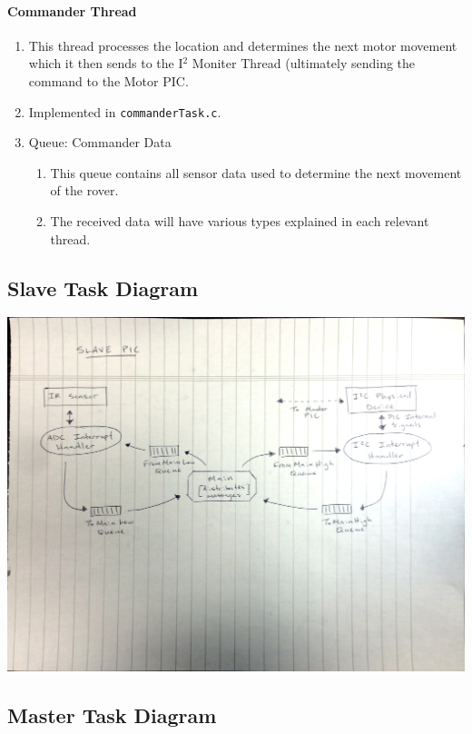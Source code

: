 \paragraph*{Commander Thread}
\begin{enumerate}
	\item This thread processes the location and determines the next motor movement which it then sends to the I$^2$ Moniter Thread (ultimately sending the command to the Motor PIC.
	\item Implemented in \texttt{commanderTask.c}.
	\item Queue: Commander Data
	\begin{enumerate}
		\item This queue contains all sensor data used to determine the next movement of the rover.
		\item The received data will have various types explained in each relevant thread.
	\end{enumerate}
\end{enumerate}

\subsection*{Slave Task Diagram}

\begin{center}
	\includegraphics[scale=0.6]{Images/SlaveTaskDiagram}
\end{center}

\subsection*{Master Task Diagram}

